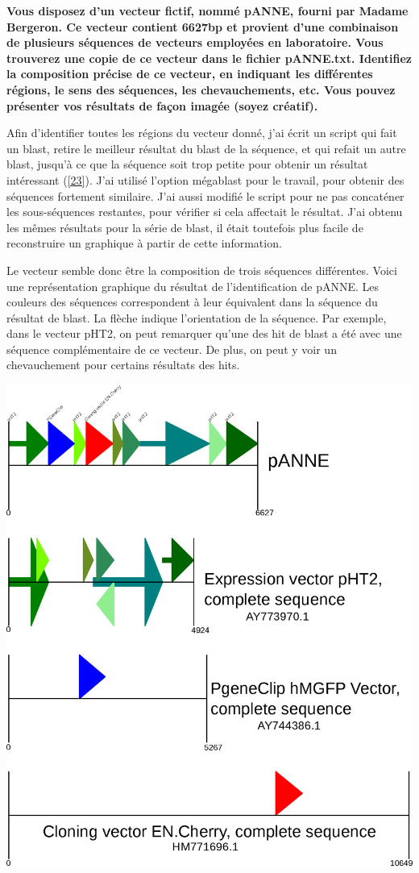 \documentclass[11pt]{article} %
\begin{document}
{\bf Vous disposez d'un vecteur fictif, nommé pANNE, fourni par Madame Bergeron. Ce vecteur contient 6627bp et provient
d'une combinaison de plusieurs séquences de vecteurs employées en laboratoire. Vous trouverez une copie de ce vecteur
dans le fichier pANNE.txt. Identifiez la composition précise de ce vecteur, en indiquant les différentes régions, le
sens des séquences, les chevauchements, etc. Vous pouvez présenter vos résultats de façon imagée (soyez créatif).}

Afin d'identifier toutes les régions du vecteur donné, j'ai écrit un script qui fait un blast, retire le
meilleur résultat du blast de la séquence, et qui refait un autre blast, jusqu'à ce que la séquence soit trop
petite pour obtenir un résultat intéressant (\ref{23}). J'ai utilisé l'option mégablast pour le travail, pour 
obtenir des séquences fortement similaire. J'ai aussi modifié le script pour ne pas concaténer les sous-séquences
restantes, pour vérifier si cela affectait le résultat. J'ai obtenu les mêmes résultats pour la série de blast,
il était toutefois plus facile de reconstruire un graphique à partir de cette information.

Le vecteur semble donc être la composition de trois séquences différentes. Voici une représentation graphique du
résultat de l'identification de pANNE. Les couleurs des séquences correspondent à leur équivalent dans la séquence
du résultat de blast. La flèche indique l'orientation de la séquence. Par exemple, dans le vecteur pHT2, on peut
remarquer qu'une des hit de blast a été avec une séquence complémentaire de ce vecteur. De plus, on peut y 
voir un chevauchement pour certains résultats des hits.

\includegraphics[width=\linewidth]{pANNE.eps}
\end{document}
